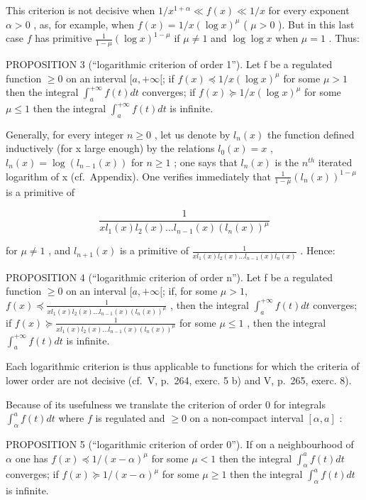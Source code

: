 This criterion is not decisive when \(1 / x^{1 + \alpha} \ll f(x) \ll 1 / x\) for every exponent \(\alpha > 0\) , as, for example, when \(f(x) = 1 / x(\log x)^{\mu}\) ( \(\mu > 0\) ). But in this last case \(f\) has primitive \(\frac{1}{1 - \mu} (\log x)^{1 - \mu}\) if \(\mu \neq 1\) and \(\log \log x\) when \(\mu = 1\) . Thus:

PROPOSITION 3 (``logarithmic criterion of order 1''). Let f be a regulated function \(\geqslant 0\) on an interval \([a, +\infty[\); if \(f(x) \preccurlyeq 1/x(\log x)^{\mu}\) for some \(\mu > 1\) then the integral \(\int_{a}^{+\infty} f(t) dt\) converges; if \(f(x) \succcurlyeq 1/x(\log x)^{\mu}\) for some \(\mu \leqslant 1\) then the integral \(\int_{a}^{+\infty} f(t) dt\) is infinite.

Generally, for every integer \(n \geqslant 0\) , let us denote by \(l_{n}(x)\) the function defined inductively (for x large enough) by the relations \(l_{0}(x) = x\) , \(l_{n}(x) = \log(l_{n-1}(x))\) for \(n \geqslant 1\) ; one says that \(l_{n}(x)\) is the \(n^{th}\) iterated logarithm of x (cf.~Appendix). One verifies immediately that \(\frac{1}{1 - \mu}\left(l_{n}(x)\right)^{1 - \mu}\) is a primitive of

\[
\frac {1}{x l _ {1} (x) l _ {2} (x) \dots l _ {n - 1} (x) \left(l _ {n} (x)\right) ^ {\mu}}
\]

for \(\mu \neq 1\) , and \(l_{n+1}(x)\) is a primitive of \(\frac{1}{xl_1(x)l_2(x)\ldots l_{n-1}(x)l_n(x)}\) . Hence:

PROPOSITION 4 (``logarithmic criterion of order n''). Let f be a regulated function \(\geqslant0\) on an interval \([a,+\infty[\); if, for some \(\mu>1\), \(f(x)\preccurlyeq\frac{1}{xl_{1}(x)l_{2}(x)\ldots l_{n-1}(x)(l_{n}(x))^{\mu}}\) , then the integral \(\int_{a}^{+\infty}f(t)dt\) converges; if \(f(x)\succcurlyeq\frac{1}{xl_{1}(x)l_{2}(x)\ldots l_{n-1}(x)(l_{n}(x))^{\mu}}\) for some \(\mu\leqslant1\) , then the integral \(\int_{a}^{+\infty}f(t)dt\) is infinite.

Each logarithmic criterion is thus applicable to functions for which the criteria of lower order are not decisive (cf.~V, p.~264, exerc. 5 b) and V, p.~265, exerc. 8).

Because of its usefulness we translate the criterion of order 0 for integrals \(\int_{\alpha}^{a}f(t)dt\) where \(f\) is regulated and \(\geqslant 0\) on a non-compact interval \([\alpha ,a]\) :

PROPOSITION 5 (``logarithmic criterion of order 0''). If on a neighbourhood of \(\alpha\) one has \(f(x) \preccurlyeq 1/(x - \alpha)^{\mu}\) for some \(\mu < 1\) then the integral \(\int_{\alpha}^{a} f(t) dt\) converges; if \(f(x) \succcurlyeq 1/(x - \alpha)^{\mu}\) for some \(\mu \geqslant 1\) then the integral \(\int_{\alpha}^{a} f(t) dt\) is infinite.

